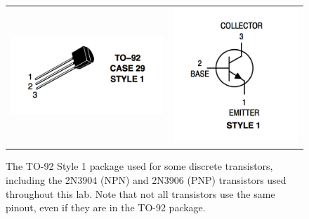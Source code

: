 \documentclass[12pt]{article}
\begin{document}
\begin{figure}[htbp]
\begin{center}
\begin{tabular}{c@{\hskip 2cm}c}
\includegraphics[height=0.10\textheight]{figs/case3904.png} &
\includegraphics[height=0.18\textheight]{figs/pinout3904.png} \\
\end{tabular}
\end{center}
\caption{The TO-92 Style 1 package used for some discrete transistors,
including the 2N3904 (NPN) and 2N3906 (PNP) transistors used throughout this lab.  Note that
not all transistors use the same pinout, even if they are in the TO-92
package.}
\label{fig:layout}
\end{figure}
\end{document}
